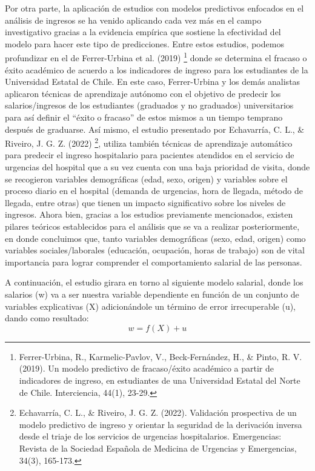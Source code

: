 \documentclass[10pt]{article}
\begin{document}
Por otra parte, la aplicación de estudios con modelos predictivos enfocados en el análisis de ingresos se ha venido aplicando cada vez más en el campo investigativo gracias a la evidencia empírica que sostiene la efectividad del modelo para hacer este tipo de predicciones. Entre estos estudios, podemos profundizar en el de Ferrer-Urbina et al. (2019) \footnote{Ferrer-Urbina, R., Karmelic-Pavlov, V., Beck-Fernández, H., \& Pinto, R. V. (2019). Un modelo predictivo de fracaso/éxito académico a partir de indicadores de ingreso, en estudiantes de una Universidad Estatal del Norte de Chile. Interciencia, 44(1), 23-29.} donde se determina el fracaso o éxito académico de acuerdo a los indicadores de ingreso para los estudiantes de la Universidad Estatal de Chile. En este caso, Ferrer-Urbina y los demás analistas aplicaron técnicas de aprendizaje autónomo con el objetivo de predecir los salarios/ingresos de los estudiantes (graduados y no graduados) universitarios para así definir el “éxito o fracaso” de estos mismos a un tiempo temprano después de graduarse. Así mismo, el estudio presentado por Echavarría, C. L., \& Riveiro, J. G. Z. (2022) \footnote{Echavarría, C. L., \& Riveiro, J. G. Z. (2022). Validación prospectiva de un modelo predictivo de ingreso y orientar la seguridad de la derivación inversa desde el triaje de los servicios de urgencias hospitalarios. Emergencias: Revista de la Sociedad Española de Medicina de Urgencias y Emergencias, 34(3), 165-173.}, utiliza también técnicas de aprendizaje automático para predecir el ingreso hospitalario para pacientes atendidos en el servicio de urgencias del hospital que a su vez cuenta con una baja prioridad de visita, donde se recogieron variables demográficas (edad, sexo, origen) y variables sobre el proceso diario en el hospital (demanda de urgencias, hora de llegada, método de llegada, entre otras) que tienen un impacto significativo sobre los niveles de ingresos. Ahora bien, gracias a los estudios previamente mencionados, existen pilares teóricos establecidos para el análisis que se va a realizar posteriormente, en donde concluimos que, tanto variables demográficas (sexo, edad, origen) como variables sociales/laborales (educación, ocupación, horas de trabajo) son de vital importancia para lograr comprender el comportamiento salarial de las personas.


A continuación, el estudio girara en torno al siguiente modelo salarial, donde los salarios (w) va a ser nuestra variable dependiente en función de un conjunto de variables explicativas (X) adicionándole un término de error irrecuperable (u), dando como resultado: 
\begin{equation}
\label{eq:ols}
    w= f(X)+u
\end{equation}
\end{document}
